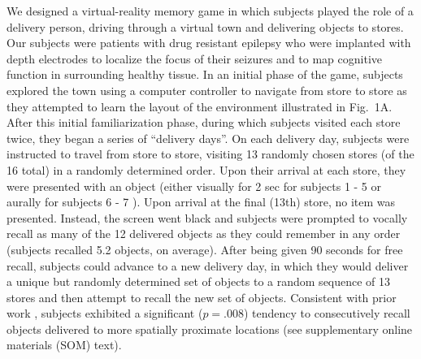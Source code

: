 We designed a virtual-reality memory game in which subjects played the role of a delivery person, driving through a virtual town and delivering objects to stores.  Our subjects were patients with drug resistant epilepsy who were implanted with depth electrodes to localize the focus of their seizures and to map cognitive function in surrounding healthy tissue. In an initial phase of the game, subjects explored the town using a computer controller to navigate from store to store as they attempted to learn the layout of the environment illustrated in Fig.~1A.  After this initial familiarization phase, during which subjects visited each store twice, they began a series of ``delivery days''.  On each delivery day, subjects were instructed to travel from store to store, visiting 13 randomly chosen stores (of the 16 total) in a randomly determined order.  Upon their arrival at each store, they were presented with an object (either visually for 2 sec for subjects 1 - 5 or aurally for subjects 6 - 7 \cite{suppnote}).  Upon arrival at the final (13th) store, no item was presented. Instead, the screen went black and subjects were prompted to vocally recall as many of the 12 delivered objects as they could remember in any order (subjects recalled 5.2 objects, on average).  After being given 90 seconds for free recall, subjects could advance to a new delivery day, in which they would deliver a unique but randomly determined set of objects to a random sequence of 13 stores and then attempt to recall the new set of objects. Consistent with prior work \cite{MillEtal12a}, subjects exhibited a significant ($p=.008$) tendency to consecutively recall objects delivered to more spatially proximate locations (see supplementary online materials (SOM) text).

